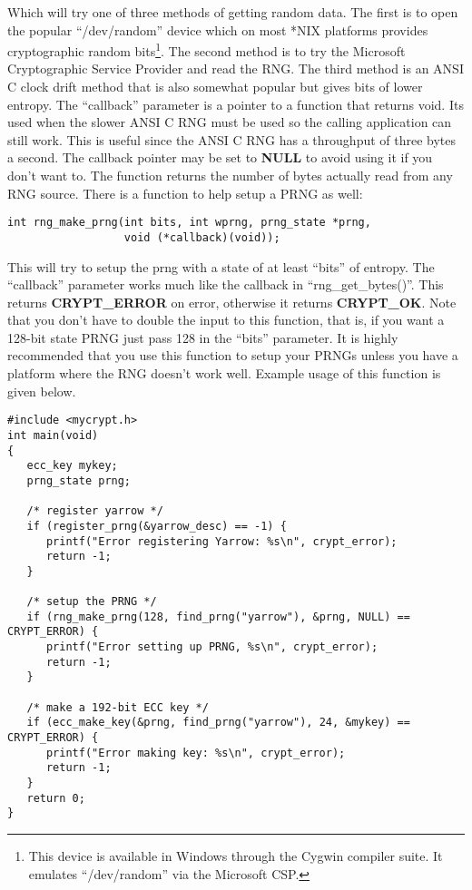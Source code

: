 \documentclass{book}
\begin{document}
Which will try one of three methods of getting random data.  The first is to open the popular ``/dev/random'' device which 
on most *NIX platforms provides cryptographic random bits\footnote{This device is available in Windows through the Cygwin compiler suite.  It emulates ``/dev/random'' via the Microsoft CSP.}.  
The second method is to try the Microsoft Cryptographic Service Provider and read the RNG.  The third method is an ANSI C 
clock drift method that is also somewhat popular but gives bits of lower entropy.  The ``callback'' parameter is a pointer to a function that returns void.  Its used when the slower ANSI C RNG must be 
used so the calling application can still work.  This is useful since the ANSI C RNG has a throughput of three 
bytes a second.  The callback pointer may be set to {\bf NULL} to avoid using it if you don't want to.  The function 
returns the number of bytes actually read from any RNG source.  There is a function to help setup a PRNG as well:
\begin{verbatim}
int rng_make_prng(int bits, int wprng, prng_state *prng, 
                  void (*callback)(void));
\end{verbatim}
This will try to setup the prng with a state of at least ``bits'' of entropy.  The ``callback'' parameter works much like
the callback in ``rng\_get\_bytes()''.  This returns {\bf CRYPT\_ERROR} on error, otherwise it returns {\bf CRYPT\_OK}.  
Note that you don't have to double the  input to this function, that is, if you want a 128-bit state PRNG just pass 128
in the ``bits'' parameter.  It is highly recommended that you use this function to setup your PRNGs unless you have a
platform where the RNG doesn't work well.  Example usage of this function is given below.

\begin{verbatim}
#include <mycrypt.h>
int main(void)
{
   ecc_key mykey;
   prng_state prng;

   /* register yarrow */
   if (register_prng(&yarrow_desc) == -1) {
      printf("Error registering Yarrow: %s\n", crypt_error);
      return -1;
   }

   /* setup the PRNG */
   if (rng_make_prng(128, find_prng("yarrow"), &prng, NULL) == CRYPT_ERROR) {
      printf("Error setting up PRNG, %s\n", crypt_error);
      return -1;
   }

   /* make a 192-bit ECC key */
   if (ecc_make_key(&prng, find_prng("yarrow"), 24, &mykey) == CRYPT_ERROR) {
      printf("Error making key: %s\n", crypt_error);
      return -1;
   }
   return 0;
}
\end{verbatim}
\end{document}

